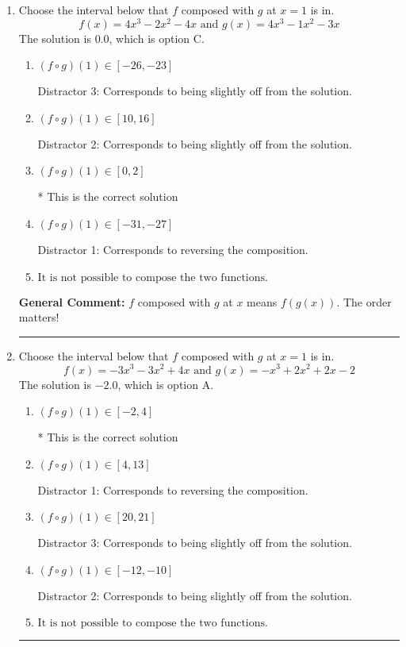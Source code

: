 \documentclass{extbook}[14pt]
\newcommand{\litem}[1]{\item #1

\rule{\textwidth}{0.4pt}}
\begin{document}
\begin{enumerate}\litem{
Choose the interval below that $f$ composed with $g$ at $x=1$ is in.
\[ f(x) = 4x^{3} -2 x^{2} -4 x \text{ and } g(x) = 4x^{3} -1 x^{2} -3 x \]The solution is \( 0.0 \), which is option C.\begin{enumerate}[label=\Alph*.]
\item \( (f \circ g)(1) \in [-26, -23] \)

 Distractor 3: Corresponds to being slightly off from the solution.
\item \( (f \circ g)(1) \in [10, 16] \)

 Distractor 2: Corresponds to being slightly off from the solution.
\item \( (f \circ g)(1) \in [0, 2] \)

* This is the correct solution
\item \( (f \circ g)(1) \in [-31, -27] \)

 Distractor 1: Corresponds to reversing the composition.
\item \( \text{It is not possible to compose the two functions.} \)


\end{enumerate}

\textbf{General Comment:} $f$ composed with $g$ at $x$ means $f(g(x))$. The order matters!
}
\litem{
Choose the interval below that $f$ composed with $g$ at $x=1$ is in.
\[ f(x) = -3x^{3} -3 x^{2} +4 x \text{ and } g(x) = -x^{3} +2 x^{2} +2 x -2 \]The solution is \( -2.0 \), which is option A.\begin{enumerate}[label=\Alph*.]
\item \( (f \circ g)(1) \in [-2, 4] \)

* This is the correct solution
\item \( (f \circ g)(1) \in [4, 13] \)

 Distractor 1: Corresponds to reversing the composition.
\item \( (f \circ g)(1) \in [20, 21] \)

 Distractor 3: Corresponds to being slightly off from the solution.
\item \( (f \circ g)(1) \in [-12, -10] \)

 Distractor 2: Corresponds to being slightly off from the solution.
\item \( \text{It is not possible to compose the two functions.} \)


\end{enumerate}

}
\end{enumerate}
\end{document}
